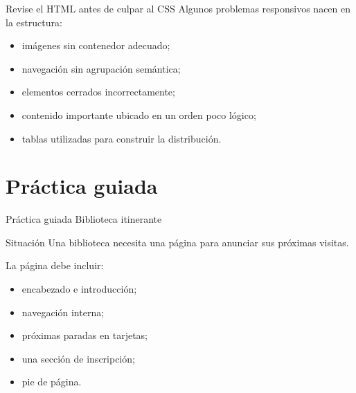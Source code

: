 \documentclass[aspectratio=169,11pt]{beamer}
\begin{document}
    \begin{frame}{Revise el HTML antes de culpar al CSS}
        Algunos problemas responsivos nacen en la estructura:

        \begin{itemize}
            \item imágenes sin contenedor adecuado;
            \item navegación sin agrupación semántica;
            \item elementos cerrados incorrectamente;
            \item contenido importante ubicado en un orden poco lógico;
            \item tablas utilizadas para construir la distribución.
        \end{itemize}

    \end{frame}

    \section{Práctica guiada}

    \SectionSlide
    {Práctica guiada}
    {Biblioteca itinerante}

    \begin{frame}{Situación}
        Una biblioteca necesita una página para anunciar sus próximas visitas.

        La página debe incluir:

        \begin{itemize}
            \item encabezado e introducción;
            \item navegación interna;
            \item próximas paradas en tarjetas;
            \item una sección de inscripción;
            \item pie de página.
        \end{itemize}

    \end{frame}
\end{document}
